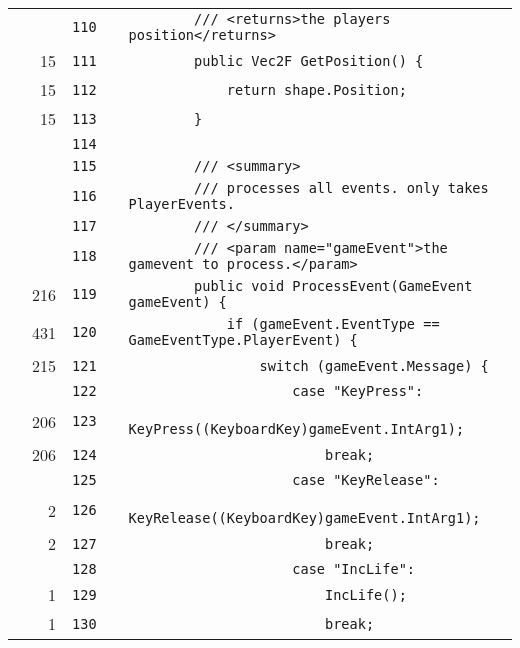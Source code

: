 \documentclass[a4paper,landscape,10pt]{article}
\begin{document}
\begin{longtable}[l]{lrrll}
\cellcolor{gray} &  & \verb~110~ & & \verb~        /// <returns>the players position</returns>~\\
\cellcolor{green} & 15 & \verb~111~ & & \verb~        public Vec2F GetPosition() {~\\
\cellcolor{green} & 15 & \verb~112~ & & \verb~            return shape.Position;~\\
\cellcolor{green} & 15 & \verb~113~ & & \verb~        }~\\
\cellcolor{gray} &  & \verb~114~ & & \verb~~\\
\cellcolor{gray} &  & \verb~115~ & & \verb~        /// <summary>~\\
\cellcolor{gray} &  & \verb~116~ & & \verb~        /// processes all events. only takes PlayerEvents.~\\
\cellcolor{gray} &  & \verb~117~ & & \verb~        /// </summary>~\\
\cellcolor{gray} &  & \verb~118~ & & \verb~        /// <param name="gameEvent">the gamevent to process.</param>~\\
\cellcolor{green} & 216 & \verb~119~ & & \verb~        public void ProcessEvent(GameEvent gameEvent) {~\\
\cellcolor{green} & 431 & \verb~120~ & & \verb~            if (gameEvent.EventType == GameEventType.PlayerEvent) {~\\
\cellcolor{green} & 215 & \verb~121~ & & \verb~                switch (gameEvent.Message) {~\\
\cellcolor{gray} &  & \verb~122~ & & \verb~                    case "KeyPress":~\\
\cellcolor{green} & 206 & \verb~123~ & & \verb~                        KeyPress((KeyboardKey)gameEvent.IntArg1);~\\
\cellcolor{green} & 206 & \verb~124~ & & \verb~                        break;~\\
\cellcolor{gray} &  & \verb~125~ & & \verb~                    case "KeyRelease":~\\
\cellcolor{green} & 2 & \verb~126~ & & \verb~                        KeyRelease((KeyboardKey)gameEvent.IntArg1);~\\
\cellcolor{green} & 2 & \verb~127~ & & \verb~                        break;~\\
\cellcolor{gray} &  & \verb~128~ & & \verb~                    case "IncLife":~\\
\cellcolor{green} & 1 & \verb~129~ & & \verb~                        IncLife();~\\
\cellcolor{green} & 1 & \verb~130~ & & \verb~                        break;~\\

\end{longtable}
\end{document}
